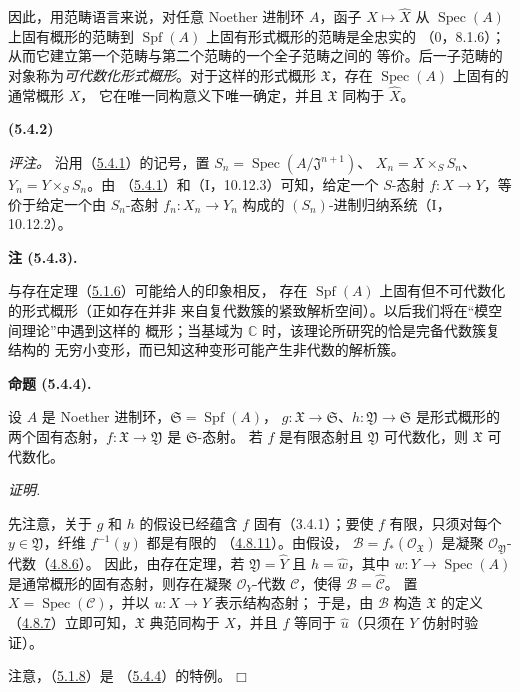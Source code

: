 \documentclass[UTF8,fontset=none,11pt,oneside,openany]{ctexbook}
\providecommand{\square}{\mdlgwhtsquare}
\newenvironment{env}[1][]{%
  \par\medskip\noindent\textbf{(#1)}\ %
}{\par}
\newenvironment{proposition}[1][]{%
  \par\medskip\noindent\textbf{命题 (#1).}\ %
}{\par}
\newenvironment{remark}[1][]{%
  \par\medskip\noindent\textbf{注 (#1).}\ %
}{\par}
\newenvironment{proof}{%
  \par\smallskip\noindent\textit{证明.}\ %
}{\hfill$\square$\par}
\let\EGAOriginalLabel\label
\renewcommand{\label}[1]{\phantomsection\EGAOriginalLabel{#1}}
\begin{document}
因此，用范畴语言来说，对任意 Noether 进制环 $A$，函子
$X\mapsto\widehat X$ 从 $\operatorname{Spec}(A)$ 上固有概形的范畴到
$\operatorname{Spf}(A)$ 上固有形式概形的范畴是全忠实的
（$0$，8.1.6）；从而它建立第一个范畴与第二个范畴的一个全子范畴之间的
等价。后一子范畴的对象称为\emph{可代数化形式概形}。对于这样的形式概形
$\mathfrak X$，存在 $\operatorname{Spec}(A)$ 上固有的通常概形 $X$，
它在唯一同构意义下唯一确定，并且 $\mathfrak X$ 同构于 $\widehat X$。

\begin{env}[5.4.2]
\label{III.5.4.2-fr}
\emph{评注。}
沿用（\hyperref[III.5.4.1-fr]{5.4.1}）的记号，置
$S_n=\operatorname{Spec}(A/\mathfrak J^{n+1})$、
$X_n=X\times_S S_n$、$Y_n=Y\times_S S_n$。由
（\hyperref[III.5.4.1-fr]{5.4.1}）和（I，10.12.3）可知，给定一个
$S$-态射 $f:X\to Y$，等价于给定一个由 $S_n$-态射
$f_n:X_n\to Y_n$ 构成的 $(S_n)$-进制归纳系统（I，10.12.2）。
\end{env}

\begin{remark}[5.4.3]
\label{III.5.4.3-fr}
与存在定理（\hyperref[III.5.1.6-fr]{5.1.6}）可能给人的印象相反，
存在 $\operatorname{Spf}(A)$ 上固有但不可代数化的形式概形（正如存在并非
来自复代数簇的紧致解析空间）。以后我们将在“模空间理论”中遇到这样的
概形；当基域为 $\mathbb C$ 时，该理论所研究的恰是完备代数簇复结构的
无穷小变形，而已知这种变形可能产生非代数的解析簇。
\end{remark}

\begin{proposition}[5.4.4]
\label{III.5.4.4-fr}
设 $A$ 是 Noether 进制环，$\mathfrak S=\operatorname{Spf}(A)$，
$g:\mathfrak X\to\mathfrak S$、$h:\mathfrak Y\to\mathfrak S$ 是形式概形的
两个固有态射，$f:\mathfrak X\to\mathfrak Y$ 是 $\mathfrak S$-态射。
若 $f$ 是有限态射且 $\mathfrak Y$ 可代数化，则 $\mathfrak X$ 可代数化。
\end{proposition}

\begin{proof}
先注意，关于 $g$ 和 $h$ 的假设已经蕴含 $f$ 固有（3.4.1）；要使 $f$
有限，只须对每个 $y\in\mathfrak Y$，纤维 $f^{-1}(y)$ 都是有限的
（\hyperref[III.4.8.11-fr]{4.8.11}）。由假设，
$\mathcal B=f_*(\mathcal O_{\mathfrak X})$ 是凝聚
$\mathcal O_{\mathfrak Y}$-代数（\hyperref[III.4.8.6-fr]{4.8.6}）。
因此，由存在定理，若 $\mathfrak Y=\widehat Y$ 且 $h=\widehat w$，其中
$w:Y\to\operatorname{Spec}(A)$ 是通常概形的固有态射，则存在凝聚
$\mathcal O_Y$-代数 $\mathcal C$，使得 $\mathcal B=\widehat{\mathcal C}$。
置 $X=\operatorname{Spec}(\mathcal C)$，并以 $u:X\to Y$ 表示结构态射；
于是，由 $\mathcal B$ 构造 $\mathfrak X$ 的定义
（\hyperref[III.4.8.7-fr]{4.8.7}）立即可知，$\mathfrak X$ 典范同构于
$\widehat X$，并且 $f$ 等同于 $\widehat u$（只须在 $Y$ 仿射时验证）。

注意，（\hyperref[III.5.1.8-fr]{5.1.8}）是
（\hyperref[III.5.4.4-fr]{5.4.4}）的特例。
\end{proof}
\end{document}
